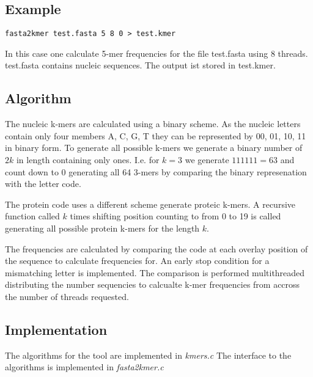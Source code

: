 \subsection{Example}

\begin{lstlisting}
fasta2kmer test.fasta 5 8 0 > test.kmer
\end{lstlisting}
In this case one calculate 5-mer frequencies for the file test.fasta
using 8 threads. test.fasta contains nucleic sequences. The output ist
stored in test.kmer.

\subsection{Algorithm}

The nucleic k-mers are calculated using a binary scheme. As the
nucleic letters contain only four members A, C, G, T they can be
represented by 00, 01, 10, 11 in binary form. To generate all possible
k-mers we generate a binary number of $2k$ in length containing only
ones. I.e. for $k=3$ we generate $111 111 = 63$ and count down to $0$
generating all 64 3-mers by comparing the binary represenation with
the letter code.

The protein code uses a different scheme generate proteic k-mers.
A recursive function called $k$ times shifting position counting to
from 0 to 19 is called generating all possible protein k-mers for the
length $k$.

The frequencies are calculated by comparing the code at each overlay
position of the sequence to calculate frequencies for. An early stop
condition for a mismatching letter is implemented. The comparison is
performed multithreaded distributing the number sequencies to
calcualte k-mer frequencies from accross the number of threads
requested.

\subsection{Implementation}

The algorithms for the tool are implemented in \emph{kmers.c}
The interface to the algorithms is implemented in \emph{fasta2kmer.c}
